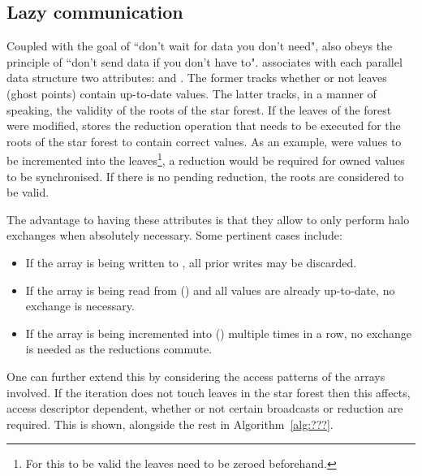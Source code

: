 \documentclass[thesis]{subfiles}
\begin{document}
\subsection{Lazy communication}

Coupled with the goal of ``don't wait for data you don't need",  also obeys the principle of ``don't send data if you don't have to".
 associates with each parallel data structure two attributes:  and .
The former tracks whether or not leaves (ghost points) contain up-to-date values.
The latter tracks, in a manner of speaking, the validity of the roots of the star forest.
If the leaves of the forest were modified,  stores the reduction operation that needs to be executed for the roots of the star forest to contain correct values.
As an example, were values to be incremented into the leaves\footnote{For this to be valid the leaves need to be zeroed beforehand.}, a  reduction would be required for owned values to be synchronised.
If there is no pending reduction, the roots are considered to be valid.

The advantage to having these attributes is that they allow  to only perform halo exchanges when absolutely necessary.
Some pertinent cases include:

\begin{itemize}
  \item If the array is being written to , all prior writes may be discarded.
  \item If the array is being read from () and all values are already up-to-date, no exchange is necessary.
  \item If the array is being incremented into () multiple times in a row, no exchange is needed as the reductions commute.
\end{itemize}

One can further extend this by considering the access patterns of the arrays involved.
If the iteration does not touch leaves in the star forest then this affects, access descriptor dependent, whether or not certain broadcasts or reduction are required.
This is shown, alongside the rest in Algorithm~\ref{alg:???}.
\end{document}
